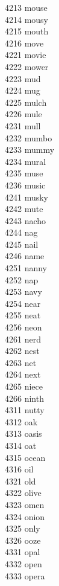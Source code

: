 4213 mouse \\
4214 mousy \\
4215 mouth \\
4216 move \\
4221 movie \\
4222 mower \\
4223 mud \\
4224 mug \\
4225 mulch \\
4226 mule \\
4231 mull \\
4232 mumbo \\
4233 mummy \\
4234 mural \\
4235 muse \\
4236 music \\
4241 musky \\
4242 mute \\
4243 nacho \\
4244 nag \\
4245 nail \\
4246 name \\
4251 nanny \\
4252 nap \\
4253 navy \\
4254 near \\
4255 neat \\
4256 neon \\
4261 nerd \\
4262 nest \\
4263 net \\
4264 next \\
4265 niece \\
4266 ninth \\
4311 nutty \\
4312 oak \\
4313 oasis \\
4314 oat \\
4315 ocean \\
4316 oil \\
4321 old \\
4322 olive \\
4323 omen \\
4324 onion \\
4325 only \\
4326 ooze \\
4331 opal \\
4332 open \\
4333 opera \\
